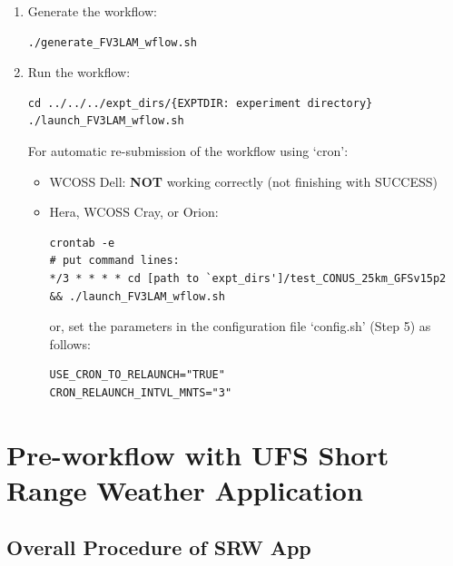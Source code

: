 \documentclass[11pt,fleqn]{report}              %
\begin{document}
\begin{enumerate}
\vspace{0.2cm}


\item Generate the workflow:
\lstset{language=bash}   
\begin{lstlisting}[frame=trBL]
./generate_FV3LAM_wflow.sh
\end{lstlisting}

\item Run the workflow: 
\lstset{language=bash}   
\begin{lstlisting}[frame=trBL]
cd ../../../expt_dirs/{EXPTDIR: experiment directory}
./launch_FV3LAM_wflow.sh
\end{lstlisting}

For automatic re-submission of the workflow using `cron':
\begin{itemize}
\item WCOSS Dell: {\bf NOT} working correctly (not finishing with SUCCESS)

\item Hera, WCOSS Cray, or Orion:
\lstset{language=bash}   
\begin{lstlisting}[frame=trBL]
crontab -e
# put command lines:
*/3 * * * * cd [path to `expt_dirs']/test_CONUS_25km_GFSv15p2 && ./launch_FV3LAM_wflow.sh
\end{lstlisting}
or, set the parameters in the configuration file `config.sh' (Step 5) as follows:
\lstset{language=bash}   
\begin{lstlisting}[frame=trBL]
USE_CRON_TO_RELAUNCH="TRUE"
CRON_RELAUNCH_INTVL_MNTS="3"
\end{lstlisting}


\end{itemize}


\end{enumerate}






\chapter{Pre-workflow with UFS Short Range Weather Application}               
\label{chpt:pre_workflow_forecast}


\section{Overall Procedure of SRW App}
\label{sec:srw_overall}
\end{document}
